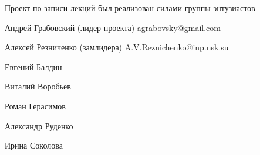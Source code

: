 \documentclass[12pt,pagesize,paper=192mm:108mm,landscape]{scrbook}
\begin{document}
\vspace*{0em}
%

  \begin{center}    
  \vfill

    \begin{minipage}{0.7\linewidth}
      Проект по записи лекций был реализован силами группы энтузиастов
\bigskip

Андрей Грабовский (лидер проекта) agrabovsky@gmail.com

Алексей Резниченко (замлидера) A.V.Reznichenko@inp.nsk.su

Евгений Балдин 

Виталий Воробьев 

Роман Герасимов

Александр Руденко

Ирина Соколова
\bigskip

    \end{minipage}
    \vfill

  \end{center}
\end{document}
